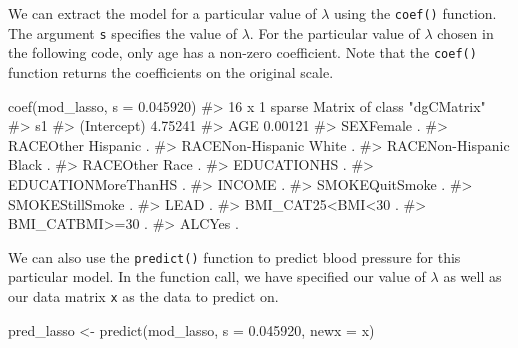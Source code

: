 \documentclass[
  letterpaper,
]{latex/krantz}
\makeatletter
\newenvironment{Shaded}{\begin{snugshade}}{\end{snugshade}}
\newcommand{\AttributeTok}[1]{\textcolor[rgb]{0.40,0.45,0.13}{#1}}
\newcommand{\CommentTok}[1]{\textcolor[rgb]{0.37,0.37,0.37}{#1}}
\newcommand{\FloatTok}[1]{\textcolor[rgb]{0.68,0.00,0.00}{#1}}
\newcommand{\FunctionTok}[1]{\textcolor[rgb]{0.28,0.35,0.67}{#1}}
\newcommand{\NormalTok}[1]{\textcolor[rgb]{0.00,0.23,0.31}{#1}}
\newcommand{\OtherTok}[1]{\textcolor[rgb]{0.00,0.23,0.31}{#1}}
\newenvironment{kframe}{%
\medskip{}
\setlength{\fboxsep}{.8em}
 \def\at@end@of@kframe{}%
 \ifinner\ifhmode%
  \def\at@end@of@kframe{\end{minipage}}%
  \begin{minipage}{\columnwidth}%
 \fi\fi%
 \def\FrameCommand##1{\hskip\@totalleftmargin \hskip-\fboxsep
 \colorbox{shadecolor}{##1}\hskip-\fboxsep
     \hskip-\linewidth \hskip-\@totalleftmargin \hskip\columnwidth}%
 \MakeFramed {\advance\hsize-\width
   \@totalleftmargin\z@ \linewidth\hsize
   \@setminipage}}%
 {\par\unskip\endMakeFramed%
 \at@end@of@kframe}
\renewenvironment{Shaded}{\begin{kframe}}{\end{kframe}}
\makeatother
\begin{document}
We can extract the model for a particular value of \(\lambda\) using the
\texttt{coef()} function. The
argument \texttt{s} specifies the value of \(\lambda\). For the
particular value of \(\lambda\) chosen in the following code, only age
has a non-zero coefficient. Note that the \texttt{coef()} function
returns the coefficients on the original scale.

\begin{Shaded}
\begin{Highlighting}[]
\FunctionTok{coef}\NormalTok{(mod\_lasso, }\AttributeTok{s =} \FloatTok{0.045920}\NormalTok{)}
\CommentTok{\#\textgreater{} 16 x 1 sparse Matrix of class "dgCMatrix"}
\CommentTok{\#\textgreater{}                             s1}
\CommentTok{\#\textgreater{} (Intercept)            4.75241}
\CommentTok{\#\textgreater{} AGE                    0.00121}
\CommentTok{\#\textgreater{} SEXFemale              .      }
\CommentTok{\#\textgreater{} RACEOther Hispanic     .      }
\CommentTok{\#\textgreater{} RACENon{-}Hispanic White .      }
\CommentTok{\#\textgreater{} RACENon{-}Hispanic Black .      }
\CommentTok{\#\textgreater{} RACEOther Race         .      }
\CommentTok{\#\textgreater{} EDUCATIONHS            .      }
\CommentTok{\#\textgreater{} EDUCATIONMoreThanHS    .      }
\CommentTok{\#\textgreater{} INCOME                 .      }
\CommentTok{\#\textgreater{} SMOKEQuitSmoke         .      }
\CommentTok{\#\textgreater{} SMOKEStillSmoke        .      }
\CommentTok{\#\textgreater{} LEAD                   .      }
\CommentTok{\#\textgreater{} BMI\_CAT25\textless{}BMI\textless{}30       .      }
\CommentTok{\#\textgreater{} BMI\_CATBMI\textgreater{}=30         .      }
\CommentTok{\#\textgreater{} ALCYes                 .}
\end{Highlighting}
\end{Shaded}

We can also use the
\texttt{predict()}
function to predict blood pressure for this particular model. In the
function call, we have specified our value of \(\lambda\) as well as our
data matrix \texttt{x} as the data to predict on.

\begin{Shaded}
\begin{Highlighting}[]
\NormalTok{pred\_lasso }\OtherTok{\textless{}{-}} \FunctionTok{predict}\NormalTok{(mod\_lasso, }\AttributeTok{s =} \FloatTok{0.045920}\NormalTok{, }\AttributeTok{newx =}\NormalTok{ x)}
\end{Highlighting}
\end{Shaded}
\end{document}
